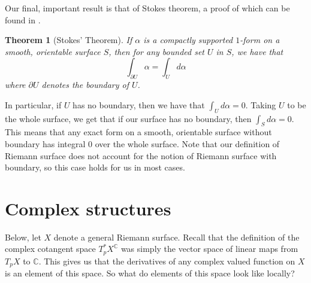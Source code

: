 \documentclass[11pt]{report}
\newtheorem{thm}{Theorem}[section]
\theoremstyle{definition}
\begin{document}
Our final, important result is that of Stokes theorem, a proof of which can be found in \cite[(p.124, Theorem 5-5)]{spivak}.
\begin{thm}[Stokes' Theorem]
  If $\alpha$ is a compactly supported $1$-form on a smooth, orientable surface $S$, then for any bounded set $U$ in $S$, we have that 
  \[\int_{\partial U} \alpha = \int_U d\alpha \]
  where $\partial U$ denotes the boundary of $U$.
\end{thm} 
In particular, if $U$ has no boundary, then we have that $\int_U d\alpha = 0$. Taking $U$ to be the whole surface, we get that if our surface has no boundary, then $\int_S d\alpha = 0$. This means that any exact form on a smooth, orientable surface without boundary has integral $0$ over the whole surface. Note that our definition of Riemann surface does not account for the notion of Riemann surface with boundary, so this case holds for us in most cases.

\section{Complex structures}
Below, let $X$ denote a general Riemann surface. Recall that the definition of the complex cotangent space $T^*_pX^{\mathbb{C}}$ was simply the vector space of linear maps from $T_pX$ to $\mathbb{C}$. This gives us that the derivatives of any complex valued function on $X$ is an element of this space. So what do elements of this space look like locally? 
\end{document}
